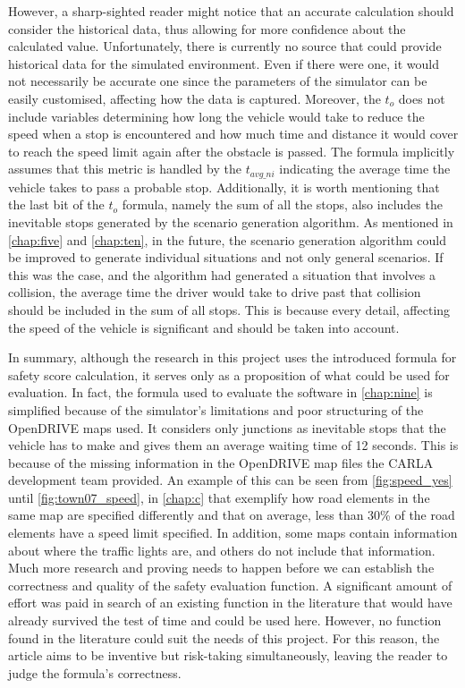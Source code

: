 However, a sharp-sighted reader might notice that an accurate calculation should consider the historical data, thus allowing for more confidence about the calculated value. Unfortunately, there is currently no source that could provide historical data for the simulated environment. Even if there were one, it would not necessarily be accurate one since the parameters of the simulator can be easily customised, affecting how the data is captured. Moreover, the $t_o$ does not include variables determining how long the vehicle would take to reduce the speed when a stop is encountered and how much time and distance it would cover to reach the speed limit again after the obstacle is passed. The formula implicitly assumes that this metric is handled by the $t_{avg\_ni}$ indicating the average time the vehicle takes to pass a probable stop. Additionally, it is worth mentioning that the last bit of the $t_o$ formula, namely the sum of all the stops, also includes the inevitable stops generated by the scenario generation algorithm. As mentioned in \autoref{chap:five} and \autoref{chap:ten}, in the future, the scenario generation algorithm could be improved to generate individual situations and not only general scenarios. If this was the case, and the algorithm had generated a situation that involves a collision, the average time the driver would take to drive past that collision should be included in the sum of all stops. This is because every detail, affecting the speed of the vehicle is significant and should be taken into account.

In summary, although the research in this project uses the introduced formula for safety score calculation, it serves only as a proposition of what could be used for evaluation. In fact, the formula used to evaluate the software in \autoref{chap:nine} is simplified because of the simulator's limitations and poor structuring of the OpenDRIVE maps used. It considers only junctions as inevitable stops that the vehicle has to make and gives them an average waiting time of 12 seconds. This is because of the missing information in the OpenDRIVE map files the CARLA development team provided. An example of this can be seen from \autoref{fig:speed_yes} until \autoref{fig:town07_speed}, in \autoref{chap:c} that exemplify how road elements in the same map are specified differently and that on average, less than 30\% of the road elements have a speed limit specified. In addition, some maps contain information about where the traffic lights are, and others do not include that information. Much more research and proving needs to happen before we can establish the correctness and quality of the safety evaluation function. A significant amount of effort was paid in search of an existing function in the literature that would have already survived the test of time and could be used here. However, no function found in the literature could suit the needs of this project. For this reason, the article aims to be inventive but risk-taking simultaneously, leaving the reader to judge the formula's correctness.
